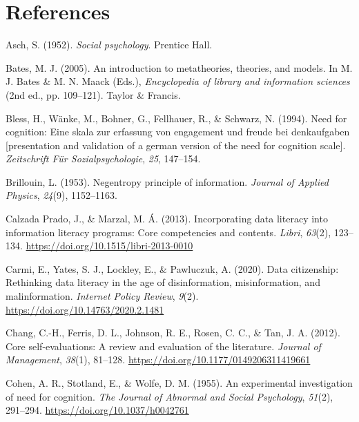 \documentclass[
  12pt,
  a4paper,
  twoside]{article}
\newlength{\cslhangindent}
\newlength{\cslentryspacingunit} %
\newenvironment{CSLReferences}[2] %
 {%
  \setlength{\parindent}{0pt}
  \ifodd #1
  \let\oldpar\par
  \def\par{\hangindent=\cslhangindent\oldpar}
  \fi
  \setlength{\parskip}{#2\cslentryspacingunit}
 }%
 {}
\begin{document}
\hypertarget{references}{%
\section*{References}\label{references}}

\hypertarget{refs}{}
\begin{CSLReferences}{1}{0}
\leavevmode{}%
Asch, S. (1952). \emph{Social psychology}. Prentice Hall.

\leavevmode{}%
Bates, M. J. (2005). An introduction to metatheories, theories, and models. In M. J. Bates \& M. N. Maack (Eds.), \emph{Encyclopedia of library and information sciences} (2nd ed., pp. 109--121). Taylor \& Francis.

\leavevmode{}%
Bless, H., Wänke, M., Bohner, G., Fellhauer, R., \& Schwarz, N. (1994). Need for cognition: Eine skala zur erfassung von engagement und freude bei denkaufgaben {[}presentation and validation of a german version of the need for cognition scale{]}. \emph{Zeitschrift Für Sozialpsychologie}, \emph{25}, 147--154.

\leavevmode{}%
Brillouin, L. (1953). Negentropy principle of information. \emph{Journal of Applied Physics}, \emph{24}(9), 1152--1163.

\leavevmode{}%
Calzada Prado, J., \& Marzal, M. Á. (2013). Incorporating data literacy into information literacy programs: Core competencies and contents. \emph{Libri}, \emph{63}(2), 123--134. \url{https://doi.org/10.1515/libri-2013-0010}

\leavevmode{}%
Carmi, E., Yates, S. J., Lockley, E., \& Pawluczuk, A. (2020). Data citizenship: Rethinking data literacy in the age of disinformation, misinformation, and malinformation. \emph{Internet Policy Review}, \emph{9}(2). \url{https://doi.org/10.14763/2020.2.1481}

\leavevmode{}%
Chang, C.-H., Ferris, D. L., Johnson, R. E., Rosen, C. C., \& Tan, J. A. (2012). Core self-evaluations: A review and evaluation of the literature. \emph{Journal of Management}, \emph{38}(1), 81--128. \url{https://doi.org/10.1177/0149206311419661}

\leavevmode{}%
Cohen, A. R., Stotland, E., \& Wolfe, D. M. (1955). An experimental investigation of need for cognition. \emph{The Journal of Abnormal and Social Psychology}, \emph{51}(2), 291--294. \url{https://doi.org/10.1037/h0042761}


\end{CSLReferences}
\end{document}
